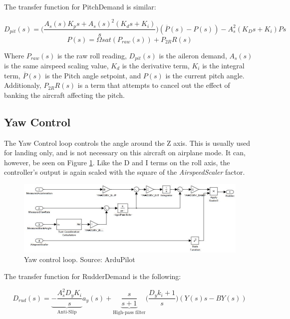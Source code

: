 The transfer function for PitchDemand is similar:

\begin{equation}
D_{pit}(s) = \bigg(\frac{A_s(s) K_p s + A_s(s)^2(K_d s + K_i)}{s}\bigg)(\overline{P}(s) - P(s)) - A_s^2(K_D s + K_i)Ps
\end{equation}
\begin{equation}
P(s) = \Omega sat(P_{raw}(s)) + P_{2R}R(s)
\end{equation}

Where $P_{raw}(s)$ is the raw roll reading, $D_{pit}(s)$ is the aileron demand, $A_s(s)$ is the same airspeed scaling value, $K_d$ is the derivative term, $K_i$ is the integral term, $\overline{P}(s)$ is the Pitch angle setpoint, and $P(s)$ is the current pitch angle. Additionaly, $P_{2R}R(s)$ is a term that attempts to cancel out the effect of banking the aircraft affecting the pitch.



\subsection{Yaw Control}
The Yaw Control loop controls the angle around the Z axis. This is usually used for landing only, and is not necessary on this aircraft on airplane mode. It can, however, be seen on Figure \ref{fig:yaw_loop}.
Like the D and I terms on the roll axis, the controller's output is again scaled with the square of the \textit{AirspeedScaler} factor.

\begin{figure}[H]
\centering
  \includegraphics[width=\linewidth]{figs/yaw_control_loop.jpg}
  \caption{Yaw control loop. Source: ArduPilot}
  \label{fig:yaw_loop}
\end{figure}

The transfer function for RudderDemand is the following:

\begin{equation}
D_{rud}(s) = \underbrace{ - \frac{A_s^2 D_y K_i}{s}}_\text{Anti-Slip} a_y(s) + \underbrace{\frac{s}{s+1}}_\text{High-pass filter}\bigg(\frac{D_y k_i + 1}{s}\bigg)(Y(s)s-BY(s))
\end{equation}


